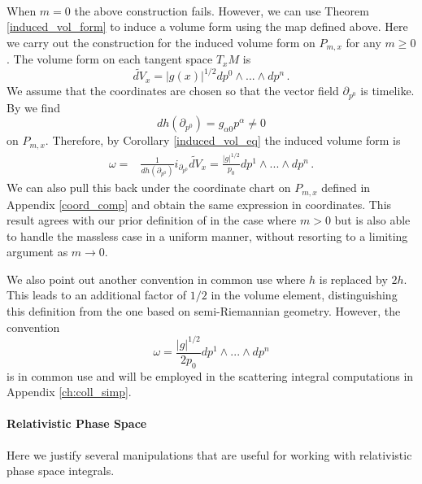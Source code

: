\\
When $m=0$ the above construction fails.  However, we can use Theorem \ref{induced_vol_form} to induce a volume form using the map  defined above. Here we carry out the construction for the induced volume form on $P_{m,x}$ for any $m\geq 0$. The volume form on each tangent space $T_xM$ is
\begin{equation}
\tilde{dV}_x=|g(x)|^{1/2}dp^0\wedge...\wedge dp^n\,.
\end{equation}
We assume that the coordinates are chosen so that the vector field $\partial_{p^0}$ is timelike. By  we find
\begin{equation}
dh(\partial_{p^0})=g_{\alpha 0}p^\alpha\neq 0
\end{equation}
on $P_{m,x}$.  Therefore, by Corollary \ref{induced_vol_eq} the induced volume form is
\begin{align}\label{mass_shell_vol}
\omega=&\frac{1}{dh(\partial_{p^0})} i_{\partial_{p^0}} \tilde{dV}_x
=\frac{|g|^{1/2}}{p_0}dp^1\wedge...\wedge dp^n\,.
\end{align}
We can also pull this back under the coordinate chart on $P_{m,x}$ defined in Appendix \ref{coord_comp} and obtain the same expression in coordinates. This result agrees with our prior definition of  in the case where $m>0$ but is also able to handle the massless case in a uniform manner, without resorting to a limiting argument as $m\rightarrow 0$.

We also point out another convention in common use where $h$ is replaced by $2h$.  This leads to an additional factor of $1/2$ in the volume element, distinguishing this definition from the one based on semi-Riemannian geometry.  However, the convention
\begin{equation}
\omega=\frac{|g|^{1/2}}{2p_0}dp^1\wedge...\wedge dp^n
\end{equation}
 is in common use and will be employed in the scattering integral computations in Appendix \ref{ch:coll_simp}.

\paragraph{Relativistic Phase Space}
Here we justify several manipulations that are useful for working with relativistic phase space integrals.

